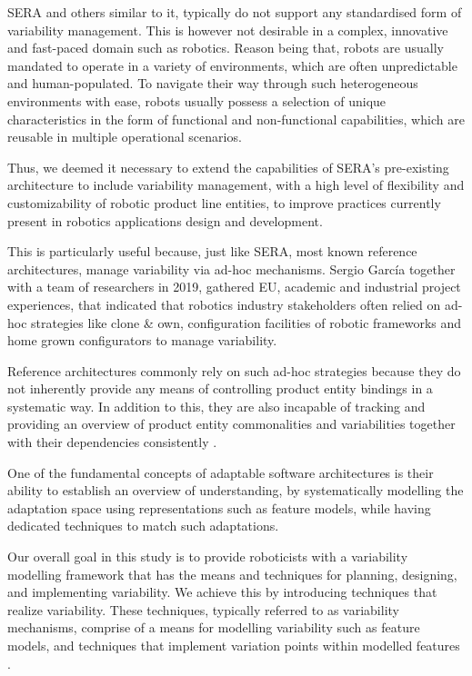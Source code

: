 \documentclass[conference]{IEEEtran}
\begin{document}
SERA and others similar to it, typically do not support any standardised form of variability management. This is however not desirable in a complex, innovative and fast-paced domain such as robotics. Reason being that, robots are usually mandated to operate in a variety of environments, which are often unpredictable and human-populated. To navigate their way through such heterogeneous environments with ease, robots usually possess a selection of unique characteristics in the form of functional and non-functional capabilities, which are reusable in multiple operational scenarios.

Thus, we deemed it necessary to extend the capabilities of SERA's pre-existing architecture to include variability management, with a high level of flexibility and customizability of robotic product line entities, to improve practices currently present in robotics applications design and development.

This is particularly useful because, just like SERA, most known reference architectures, manage variability via ad-hoc mechanisms. Sergio Garc\'{i}a \cite{var-mod-chall} together with a team of researchers in 2019, gathered EU, academic and industrial project experiences, that indicated that robotics industry stakeholders often relied on ad-hoc strategies like clone \& own, configuration facilities of robotic frameworks and home grown configurators to manage variability.

Reference architectures commonly rely on such ad-hoc strategies because they do not inherently provide any means of controlling product entity bindings in a systematic way. In addition to this, they are also incapable of tracking and providing an overview of product entity commonalities and variabilities together with their dependencies consistently \cite{var-mod-ind}.

One of the fundamental concepts of adaptable software architectures is their ability to establish an overview of understanding, by systematically modelling the adaptation space using representations such as feature models, while having dedicated techniques to match such adaptations.

Our overall goal in this study is to provide roboticists with a variability modelling framework that has the means and techniques for planning, designing, and implementing variability. We achieve this by introducing techniques that realize variability. These techniques, typically referred to as variability mechanisms, comprise of a means for modelling variability such as feature models, and techniques that implement variation points within modelled features \cite{var-mod-ind}.
\end{document}
